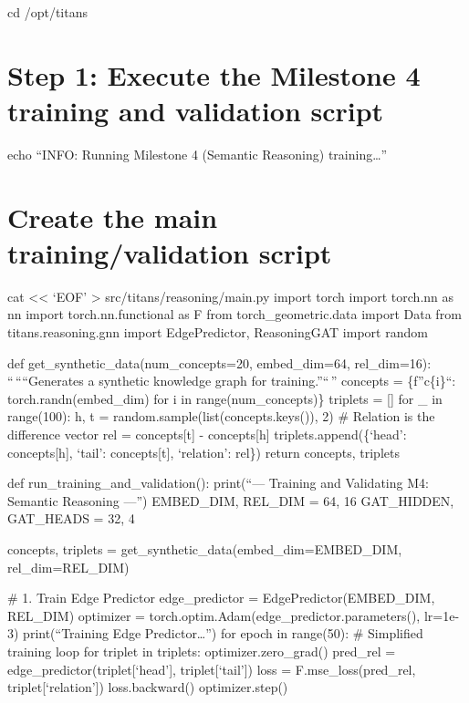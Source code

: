 \documentclass[letterpaper,twocolumn]{article}
\begin{document}
cd /opt/titans

\hypertarget{step-1-execute-the-milestone-4-training-and-validation-script}{%
\section{Step 1: Execute the Milestone 4 training and validation
script}\label{step-1-execute-the-milestone-4-training-and-validation-script}}

echo ``INFO: Running Milestone 4 (Semantic Reasoning) training\ldots{}''

\hypertarget{create-the-main-trainingvalidation-script}{%
\section{Create the main training/validation
script}\label{create-the-main-trainingvalidation-script}}

cat \textless\textless{} `EOF' \textgreater{}
src/titans/reasoning/main.py import torch import torch.nn as nn import
torch.nn.functional as F from torch\_geometric.data import Data from
titans.reasoning.gnn import EdgePredictor, ReasoningGAT import random

def get\_synthetic\_data(num\_concepts=20, embed\_dim=64, rel\_dim=16):
``\,````Generates a synthetic knowledge graph for training.''``\,''
concepts = \{f''c\{i\}``: torch.randn(embed\_dim) for i in
range(num\_concepts)\} triplets = {[}{]} for \_ in range(100): h, t =
random.sample(list(concepts.keys()), 2) \# Relation is the difference
vector rel = concepts{[}t{]} - concepts{[}h{]} triplets.append(\{`head':
concepts{[}h{]}, `tail': concepts{[}t{]}, `relation': rel\}) return
concepts, triplets

def run\_training\_and\_validation(): print(``--- Training and
Validating M4: Semantic Reasoning ---'') EMBED\_DIM, REL\_DIM = 64, 16
GAT\_HIDDEN, GAT\_HEADS = 32, 4

concepts, triplets = get\_synthetic\_data(embed\_dim=EMBED\_DIM,
rel\_dim=REL\_DIM)

\# 1. Train Edge Predictor edge\_predictor = EdgePredictor(EMBED\_DIM,
REL\_DIM) optimizer = torch.optim.Adam(edge\_predictor.parameters(),
lr=1e-3) print(``Training Edge Predictor\ldots{}'') for epoch in
range(50): \# Simplified training loop for triplet in triplets:
optimizer.zero\_grad() pred\_rel = edge\_predictor(triplet{[}`head'{]},
triplet{[}`tail'{]}) loss = F.mse\_loss(pred\_rel,
triplet{[}`relation'{]}) loss.backward() optimizer.step()
\end{document}
